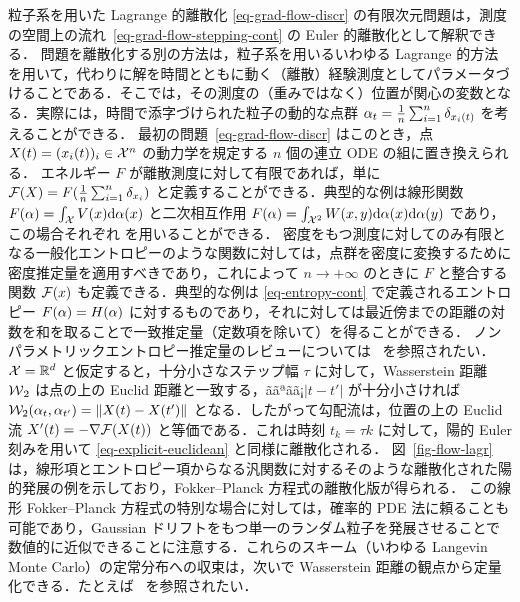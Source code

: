 \begin{rem1}{粒子系を用いた Lagrange 的離散化}\label{rem-lagr-discretization}
\eqref{eq-grad-flow-discr} の有限次元問題は，測度の空間上の流れ~\eqref{eq-grad-flow-stepping-cont} の Euler 的離散化として解釈できる．
%
問題を離散化する別の方法は，粒子系を用いるいわゆる Lagrange 的方法を用いて，代わりに解を時間とともに動く（離散）経験測度としてパラメータづけることである．そこでは，その測度の（重みではなく）位置が関心の変数となる．実際には，時間で添字づけられた粒子の動的な点群 $\alpha_t = \frac{1}{n}\sum_{i=1}^n \delta_{x_i(t)}$ を考えることができる．
%
最初の問題~\eqref{eq-grad-flow-discr} はこのとき，点 $X(t)=(x_i(t))_i \in \mathcal{X}^n$ の動力学を規定する $n$ 個の連立 ODE の組に置き換えられる．
%
エネルギー $F$ が離散測度に対して有限であれば，単に $\mathcal{F}(X)=F( \frac{1}{n}\sum_{i=1}^n \delta_{x_i} )$ と定義することができる．典型的な例は線形関数 $F(\alpha) = \int_{\mathcal{X}} V(x) \mathrm{d}\alpha(x)$ と二次相互作用 $F(\alpha) = \int_{\mathcal{X}^2} W(x,y) \mathrm{d}\alpha(x)\mathrm{d}\alpha(y)$ であり，この場合それぞれ
を用いることができる．
%
密度をもつ測度に対してのみ有限となる一般化エントロピーのような関数に対しては，点群を密度に変換するために密度推定量を適用すべきであり，これによって $n \rightarrow +\infty$ のときに $F$ と整合する関数 $\mathcal{F}(x)$ も定義できる．典型的な例は \eqref{eq-entropy-cont} で定義されるエントロピー $F(\alpha) = H(\alpha)$ に対するものであり，それに対しては最近傍までの距離の対数を和を取ることで一致推定量（定数項を除いて）を得ることができる．
ノンパラメトリックエントロピー推定量のレビューについては~\citet{beirlant1997nonparametric} を参照されたい．
%
$\mathcal{X}=\mathbb{R}^d$ と仮定すると，十分小さなステップ幅 $\tau$ に対して，Wasserstein 距離 $\operatorname{\mathcal{W}}_2$ は点の上の Euclid 距離と一致する，ããªãã¡$|t-t'|$ が十分小さければ $\mathcal{W}_2(\alpha_t,\alpha_{t'})=\left\| X(t)-X(t') \right\|$ となる．したがって勾配流は，位置の上の Euclid 流 $X'(t) = -\nabla \mathcal{F}(X(t))$ と等価である．これは時刻 $t_k=\tau k$ に対して，陽的 Euler 刻みを用いて \eqref{eq-explicit-euclidean} と同様に離散化される．
%
図~\ref{fig-flow-lagr} は，線形項とエントロピー項からなる汎関数に対するそのような離散化された陽的発展の例を示しており，Fokker--Planck 方程式の離散化版が得られる．
%
この線形 Fokker--Planck 方程式の特別な場合に対しては，確率的 PDE 法に頼ることも可能であり，Gaussian ドリフトをもつ単一のランダム粒子を発展させることで数値的に近似できることに注意する．これらのスキーム（いわゆる Langevin Monte Carlo）の定常分布への収束は，次いで Wasserstein 距離の観点から定量化できる．たとえば~\citep{dalalyan2017user} を参照されたい．

\end{rem1}
